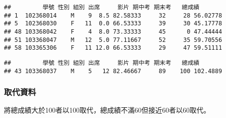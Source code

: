 \documentclass[
]{book}
\newenvironment{Shaded}{\begin{snugshade}}{\end{snugshade}}
\newcommand{\DecValTok}[1]{\textcolor[rgb]{0.00,0.00,0.81}{#1}}
\newcommand{\FunctionTok}[1]{\textcolor[rgb]{0.00,0.00,0.00}{#1}}
\newcommand{\NormalTok}[1]{#1}
\newcommand{\OtherTok}[1]{\textcolor[rgb]{0.56,0.35,0.01}{#1}}
\newcommand{\SpecialCharTok}[1]{\textcolor[rgb]{0.00,0.00,0.00}{#1}}
\newcommand{\StringTok}[1]{\textcolor[rgb]{0.31,0.60,0.02}{#1}}
\begin{document}
\begin{Shaded}
\end{Shaded}

\begin{verbatim}
##         學號 性別 組別 出席     影片 期中考 期末考   總成績
## 1  102368014    M    9  8.5 82.58333     32     28 56.02778
## 5  102368030    F   11  0.0 66.53333     39     30 45.17778
## 48 103368042    F    4  8.0 73.33333     45      0 47.44444
## 51 103368047    M   12  5.0 77.11667     52     35 59.70556
## 58 103365306    F   11 12.0 66.53333     29     47 59.51111
\end{verbatim}

\begin{Shaded}
\end{Shaded}

\begin{verbatim}
##         學號 性別 組別 出席     影片 期中考 期末考   總成績
## 43 103368037    M    5   12 82.46667     89    100 102.4889
\end{verbatim}

\hypertarget{ux53d6ux4ee3ux8cc7ux6599}{%
\subsubsection{取代資料}\label{ux53d6ux4ee3ux8cc7ux6599}}

將總成績大於100者以100取代，總成績不滿60但接近60者以60取代。

\begin{Shaded}
\end{Shaded}
\end{document}
